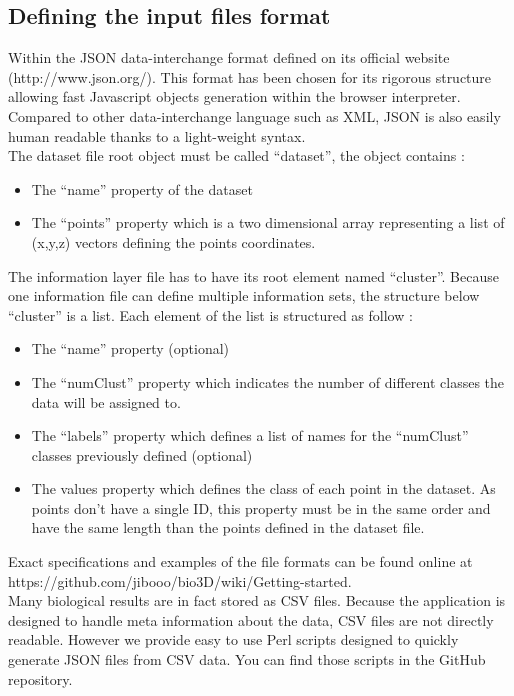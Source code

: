 \documentclass{bioinfo}
\begin{document}
\subsection{Defining the input files format}
Within the JSON data-interchange format defined on its official website (http://www.json.org/). This format has been chosen for its rigorous structure allowing fast Javascript objects generation within the browser interpreter. Compared to other data-interchange language such as XML, JSON is also easily human readable thanks to a light-weight syntax.\\
The dataset file root object must be called “dataset”, the object contains :
\begin{itemize}
\item The “name” property of the dataset
\item The “points” property which is a two dimensional array representing a list of (x,y,z) vectors defining the points coordinates.
\end{itemize}

The information layer file has to have its root element named  “cluster”. Because one information file can define multiple information sets, the structure below “cluster” is a list. Each element of the list is structured as follow :
\begin{itemize}
\item The “name” property (optional)
\item The “numClust” property which indicates the number of different classes the data will be assigned to.
\item The “labels” property which defines a list of names for the “numClust” classes previously defined (optional)
\item The values property which defines the class of each point in the dataset. As points don't have a single ID, this property must be in the same order and have the same length than the points defined in the dataset file.
\end{itemize}
Exact specifications and examples of the file formats can be found online at https://github.com/jibooo/bio3D/wiki/Getting-started.\\
Many biological results are in fact stored as CSV files. Because the application is designed to handle meta information about the data, CSV files are not directly readable. However we provide easy to use Perl scripts designed to quickly generate JSON files from CSV data. You can find those scripts in the GitHub repository.
\end{document}
